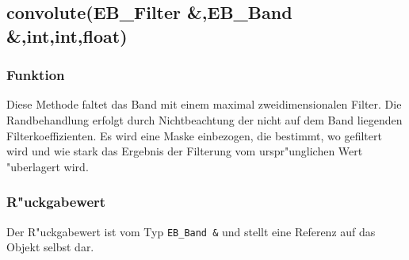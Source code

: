 \documentclass[12pt,a4paper,draft,twoside,onecolumn,titlepage]{book}
\newcommand{\ctyp}[1]{{\tt #1}}
\newcommand{\arglist}[1]{\footnotesize{#1}}
\begin{document}
\subsection{convolute{\arglist(EB\_Filter \&,EB\_Band \&,int,int,float)}}
\subsubsection{Funktion}
Diese Methode faltet das Band mit einem maximal zweidimensionalen Filter. Die Randbehandlung erfolgt durch Nichtbeachtung der nicht auf dem Band liegenden Filterkoeffizienten. Es wird eine Maske einbezogen, die bestimmt, wo gefiltert wird und wie stark das Ergebnis der Filterung vom urspr"unglichen Wert "uberlagert wird.
\subsubsection{R"uckgabewert}
Der R"uckgabewert ist vom Typ \ctyp{EB\_Band \&} und stellt eine Referenz auf das Objekt selbst dar. 
\end{document}
